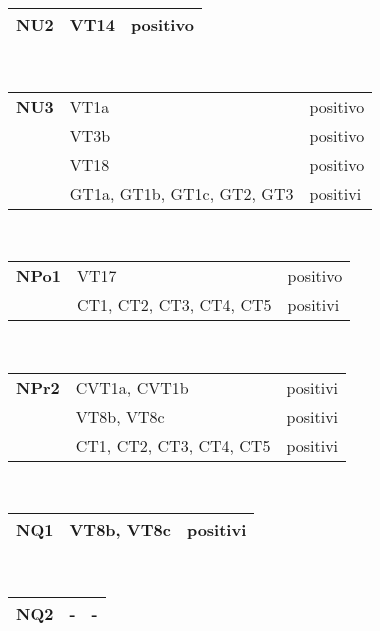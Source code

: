  \begin{center}
\begin{tabular}{|p{2cm}|p{7cm}|p{2cm}|} \hline
\textbf{NU2} & VT14 & positivo\\ \hline
\end{tabular} \\
\end{center}

 \begin{center}
\begin{tabular}{|p{2cm}|p{7cm}|p{2cm}|} \hline
\textbf{NU3} & VT1a& positivo\\ \cline{2-3}
&  VT3b& positivo\\ \cline{2-3}
&  VT18& positivo\\ \cline{2-3}
&  GT1a, GT1b, GT1c, GT2, GT3 & positivi\\ \hline
\end{tabular} \\
\end{center}

 \begin{center}
\begin{tabular}{|p{2cm}|p{7cm}|p{2cm}|} \hline
\textbf{NPo1} &  VT17& positivo\\ \cline{2-3}
&  CT1, CT2, CT3, CT4, CT5 & positivi\\ \hline
\end{tabular} \\
\end{center}

 \begin{center}
\begin{tabular}{|p{2cm}|p{7cm}|p{2cm}|} \hline
\textbf{NPr2} &  CVT1a, CVT1b& positivi\\ \cline{2-3}
& VT8b, VT8c & positivi\\ \cline{2-3}
&  CT1, CT2, CT3, CT4, CT5 & positivi \\ \hline
\end{tabular} \\
\end{center}

 \begin{center}
\begin{tabular}{|p{2cm}|p{7cm}|p{2cm}|} \hline
\textbf{NQ1} & VT8b, VT8c & positivi \\ \hline
\end{tabular} \\
\end{center}

 \begin{center}
\begin{tabular}{|p{2cm}|p{7cm}|p{2cm}|} \hline
\textbf{NQ2} &  - & -\\ \hline
\end{tabular} \\
\end{center}

